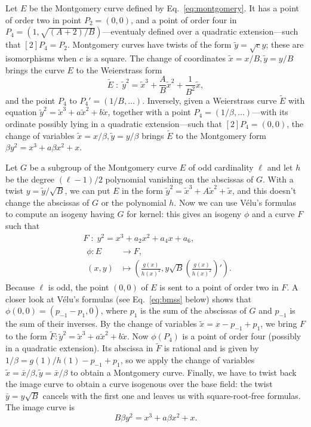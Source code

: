 \documentclass[envcountsect,envcountsame,runningheads]{llncs}   %
\begin{document}
Let $E$ be the Montgomery curve defined by Eq.~\eqref{eq:montgomery}.
It has a point of order two in point $P_2=(0,0)$, and a point of order
four in $P_4=(1,\sqrt{(A+2)/B})$---eventualy defined over a quadratic
extension---such that $[2]P_4=P_2$. Montgomery curves have twists of
the form $\tilde{y}=\sqrt{c}y$; these are isomorphisms when $c$ is
a square. The change of coordinates $\tilde{x}=x/B, \tilde{y}=y/B$
brings the curve $E$ to the Weierstrass form
\begin{equation*}
  \tilde{E}\;:\;\tilde{y}^2 = \tilde{x}^3 + \frac{A}{B}\tilde{x}^2 + \frac{1}{B^2}\tilde{x},
\end{equation*}
and the point $P_4$ to $P_4'=(1/B,\ldots)$. Inversely, given a
Weierstrass curve $\tilde{E}$ with equation
$\tilde{y}^2=\tilde{x}^3+a\tilde{x}^2+b\tilde{x}$, together with a
point $P_4=(1/\beta,\ldots)$---with its ordinate possibly lying in a
quadratic extension---such that $[2]P_4=(0,0)$, the change of
variables $\tilde{x}=x/\beta, \tilde{y}=y/\beta$ brings $\tilde{E}$ to
the Montgomery form $\beta y^2=x^3+a\beta x^2 + x$.

Let $G$ be a subgroup of the Montgomery curve $E$ of odd cardinality
$\ell$ and let $h$ be the degree $(\ell-1)/2$ polynomial vanishing on
the abscissas of $G$. With a twist $y=\tilde{y}/\sqrt{B}$, we can put
$E$ in the form $\tilde{y}^2 = \tilde{x}^3 + A\tilde{x}^2 +
\tilde{x}$, and this doesn't change the abscissas of $G$ or the
polynomial $h$. Now we can use V\'elu's formulas to compute an isogeny
having $G$ for kernel: this gives an isogeny $\phi$ and a curve $F$
such that
\begin{align*}
  &F\;:\; y^2 = x^3 + a_2x^2 + a_4x + a_6,\\
  &\begin{aligned}
    \phi : E &\to F,\\
    (x,y) &\mapsto \left(\frac{g(x)}{h(x)^2}, y\sqrt{B}\left(\frac{g(x)}{h(x)^2}\right)'\right).
  \end{aligned}
\end{align*}
Because $\ell$ is odd, the point $(0,0)$ of $E$ is sent to a point of
order two in $F$. A closer look at V\'elu's formulas (see
Eq.~\eqref{eq:bmss} below) shows that $\phi(0,0) = (p_{-1} - p_1, 0)$,
where $p_1$ is the sum of the abscissas of $G$ and $p_{-1}$ is the sum
of their inverses. By the change of variables
$\tilde{x}=x-p_{-1}+p_1$, we bring $F$ to the form
$\tilde{F}:\tilde{y}^2=\tilde{x}^3+a\tilde{x}^2+b\tilde{x}$. Now
$\phi(P_4)$ is a point of order four (possibly in a quadratic
extension). Its abscissa in $\tilde{F}$ is rational and is given by
$1/\beta=g(1)/h(1)-p_{-1}+p_1$, so we apply the change of variables
$\tilde{x}=\bar{x}/\beta,\tilde{y}=\bar{x}/\beta$ to obtain a
Montgomery curve. Finally, we have to twist back the image curve to
obtain a curve isogenous over the base field: the twist $\bar{y} =
y\sqrt{B}$ cancels with the first one and leaves us with
square-root-free formulas. The image curve is
\begin{equation}
  \label{eq:montgomery-image}
  B\beta y^2 = x^3 + a\beta x^2 + x.
\end{equation}
\end{document}
